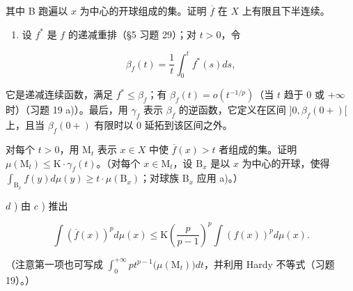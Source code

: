 其中 B 跑遍以 \(x\) 为中心的开球组成的集。证明 \(\overline{f}\) 在 \(X\) 上有限且下半连续。

\begin{enumerate}
\def\labelenumi{\alph{enumi})}
\setcounter{enumi}{2}
\tightlist
\item
  设 \(f^*\) 是 \(f\) 的递减重排（§5 习题 29）；对 \(t > 0\)，令
\end{enumerate}

\[
\beta_ {f} (t) = \frac {1}{t} \int_ {0} ^ {t} f ^ {*} (s) d s,
\]

它是递减连续函数，满足 \(f^* \leqslant \beta_f\)；有 \(\beta_f(t) = o(t^{-1/p})\)（当 \(t\) 趋于 0 或 \(+\infty\) 时）（习题 19 a)）。最后，用 \(\gamma_f\) 表示 \(\beta_f\) 的逆函数，它定义在区间 \(]0, \beta_f(0+)[\) 上，且当 \(\beta_f(0+)\) 有限时以 0 延拓到该区间之外。

对每个 \(t > 0\)，用 \(\mathrm{M}_t\) 表示 \(x \in X\) 中使 \(\overline{f}(x) > t\) 者组成的集。证明 \(\mu(\mathrm{M}_t) \leqslant \mathrm{K} \cdot \gamma_f(t)\)。（对每个 \(x \in \mathrm{M}_t\)，设 \(\mathrm{B}_x\) 是以 \(x\) 为中心的开球，使得 \(\int_{\mathrm{B}_x} f(y) d\mu(y) \geqslant t \cdot \mu(\mathrm{B}_x)\)；对球族 \(\mathrm{B}_x\) 应用 a)。）

\(d\) ) 由 \(c\) ) 推出

\[
\int \left(\overline {{f}} (x)\right) ^ {p} d \mu (x) \leqslant \mathrm{K} \left(\frac {p}{p - 1}\right) ^ {p} \int \left(f (x)\right) ^ {p} d \mu (x).
\]

（注意第一项也可写成 \(\int_0^{+\infty}pt^{p - 1}\big(\mu (\mathrm{M}_t)\big)dt\)，并利用 Hardy 不等式（习题 19）。）
\relax{}
\setcounter{exercisegroup}{7}
\edef\CurrentExerciseGroup{\arabic{exercisegroup}}

